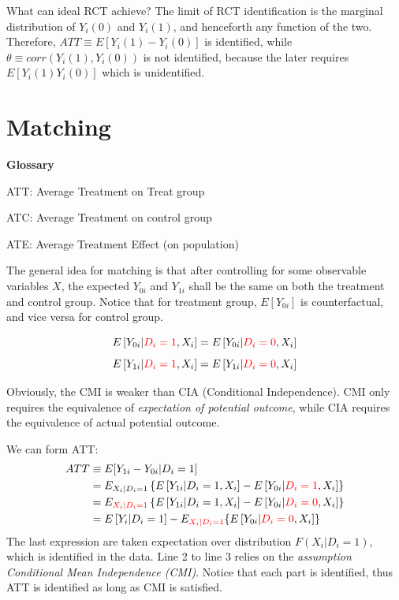 What can ideal RCT achieve?
The limit of RCT identification is the marginal distribution of $Y_i(0)$ and $Y_i(1)$, and henceforth any function of the two.
Therefore, $ATT \equiv E[Y_i(1)-Y_i(0)]$ is identified, while $\theta\equiv corr(Y_i(1),Y_i(0))$ is not identified, because the later requires $E[Y_i(1)Y_i(0)]$ which is unidentified.


\section{Matching} %
\label{sec:matching}

\textbf{Glossary}

ATT: Average Treatment on Treat group

ATC: Average Treatment on control group

ATE: Average Treatment Effect (on population)

The general idea for matching is that after controlling for some observable variables $X$, the expected $Y_{0i}$ and $Y_{1i}$ shall be the same on both the treatment and control group. Notice that for treatment group, $E[Y_{0i}]$ is counterfactual, and vice versa for control group.

\begin{assp}
    \[E\left[Y_{0i}|{\color{red} D_i=1},X_i\right] = E\left[Y_{0i}|{\color{red} D_i=0},X_i\right]\]
    \[E\left[Y_{1i}|{\color{red} D_i=1},X_i\right] = E\left[Y_{1i}|{\color{red} D_i=0},X_i\right]\]
\end{assp}
Obviously, the CMI is weaker than CIA (Conditional Independence).
CMI only requires the equivalence of \textit{expectation of potential outcome}, while CIA requires the equivalence of actual potential outcome. 


We can form ATT:
\begin{align*}
    ATT &\equiv E[Y_{1i}-Y_{0i} | D_i = 1] \\
    &= E_{X_i|D_i=1} \left\{ E\left[Y_{1i}|D_i=1,X_i\right] - E\left[Y_{0i}|{\color{red} D_i=1},X_i\right]  \right\}\\
    &= E_{{\color{red} X_i|D_i=1}} \left\{ E\left[Y_{1i}|D_i=1,X_i\right] - E\left[Y_{0i}|{\color{red} D_i=0},X_i\right]  \right\} \\
    &= E\left[Y_i|D_i=1\right] - E_{{\color{red} X_i|D_i=1}} \{E\left[Y_{0i}|{\color{red} D_i=0},X_i\right] \}
\end{align*}
The last expression are taken expectation over distribution $F(X_i|D_i=1)$, which is identified in the data.
Line 2 to line 3 relies on the \textit{assumption Conditional Mean Independence (CMI)}.
Notice that each part is identified,
thus ATT is identified as long as CMI is satisfied.


